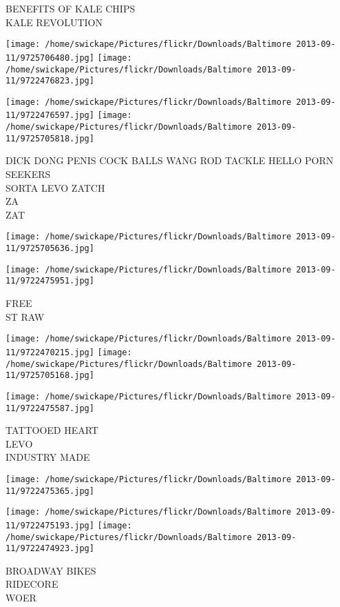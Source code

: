 \documentclass[10pt,letterpaper]{article}
\begin{document}
BENEFITS OF KALE CHIPS\\
KALE REVOLUTION
\pagebreak

\texttt{[image: /home/swickape/Pictures/flickr/Downloads/Baltimore 2013-09-11/9725706480.jpg]}
\texttt{[image: /home/swickape/Pictures/flickr/Downloads/Baltimore 2013-09-11/9722476823.jpg]}

\texttt{[image: /home/swickape/Pictures/flickr/Downloads/Baltimore 2013-09-11/9722476597.jpg]}
\texttt{[image: /home/swickape/Pictures/flickr/Downloads/Baltimore 2013-09-11/9725705818.jpg]}

DICK DONG PENIS COCK BALLS WANG ROD TACKLE HELLO PORN SEEKERS\\
SORTA LEVO ZATCH\\
ZA\\
ZAT
\pagebreak

\texttt{[image: /home/swickape/Pictures/flickr/Downloads/Baltimore 2013-09-11/9725705636.jpg]}

\vspace{0.25in}
\texttt{[image: /home/swickape/Pictures/flickr/Downloads/Baltimore 2013-09-11/9722475951.jpg]}

FREE\\
ST RAW
\pagebreak

\texttt{[image: /home/swickape/Pictures/flickr/Downloads/Baltimore 2013-09-11/9722470215.jpg]}
\texttt{[image: /home/swickape/Pictures/flickr/Downloads/Baltimore 2013-09-11/9725705168.jpg]}

\texttt{[image: /home/swickape/Pictures/flickr/Downloads/Baltimore 2013-09-11/9722475587.jpg]}

TATTOOED HEART\\
LEVO\\
INDUSTRY MADE
\pagebreak

\texttt{[image: /home/swickape/Pictures/flickr/Downloads/Baltimore 2013-09-11/9722475365.jpg]}

\vspace{0.25in}
\texttt{[image: /home/swickape/Pictures/flickr/Downloads/Baltimore 2013-09-11/9722475193.jpg]}
\texttt{[image: /home/swickape/Pictures/flickr/Downloads/Baltimore 2013-09-11/9722474923.jpg]}

BROADWAY BIKES\\
RIDECORE\\
WOER
\pagebreak
\end{document}
